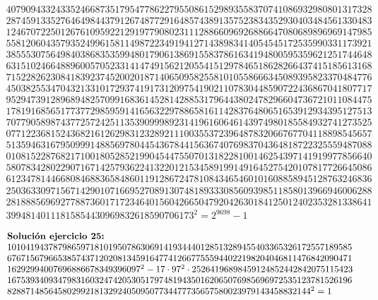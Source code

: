 \documentclass[12pt]{amsart}
\theoremstyle{plain}
\begin{document}
\begin{equation*}
\begin{array}{l}
40790943324335246687351795477862279550861529893558370741086932980801317328 \\
28745913352764649844379126748772916485743891357523834352930403484561330483 \\
12467072250126761095922129197790802311128866096926886647080689896969147985 \\
55812060435793524996158114987223491941271438983414054545172535990331173921 \\
38555307564984038683535994801790613869155837861634194800595359621251744648 \\
63151024664889600570523314147491562120554151297846518628266437415185613168 \\
71522826230841839237452002018714065095825581010558666345089395823370484776 \\
45038255347043213310172937419173120975419021107830448590722436867041807717 \\
95294739128968948257099168361452814288531796443802478296604736721011084475 \\
17819168565177377298595914165632297886581611428376480651653912934395127513 \\
70779058987437725724251135390999892314196160646143974980185584932741273525 \\
07712236815243682161262983123289211100355372396487832066767704118898545657 \\
51359463167950999148856978044543678441563674076983704364818722325559487088 \\
01081522876821710018052852199045447550701318228100146254397141919977856640 \\
58078342802290716714257936224132201215345891991491645275420107817726645086 \\
61234781446680846883658486011912867247810843465460101608858945128763246836 \\
25036330971567142901071669527089130748189333085609398511858013966946006288 \\
28188856969277887360171723464015604266504792042630184125012402353281338641 \\
39948140111815854430969832618590706173 ^2 = 2^{9698}-1 
\end{array}
\end{equation*}

\begin{equation*} \label{solucion25}
\begin{array}{l}
\noindent\textbf{Solución ejercicio 25:} \\
101041943787986597181019507863069141934440128513289455403365326172557189585 \\
676715679665385743712020813459164774126677555944022198204046811476842090471 \\
16292994007696886678349396097^2- 17\cdot97^2 \cdot25264196898459124852442842075115423 \\
167539340934798316032474205305179748194350162065076985696972535123781526196 \\
828871485645802992181329240509507734477735657580023979143458832144^2 = 1
\end{array}
\end{equation*}
\end{document}
